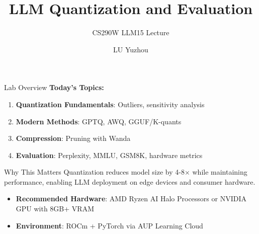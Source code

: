 \documentclass[aspectratio=169,10pt]{beamer}
\title{LLM Quantization and Evaluation}
\subtitle{CS290W LLM15 Lecture}
\author{LU Yuzhou}
\date{}
\begin{document}
\frame{\titlepage}

\begin{frame}{Lab Overview}
    \textbf{Today's Topics:}
    \begin{enumerate}
        \item \textbf{Quantization Fundamentals}: Outliers, sensitivity analysis
        \item \textbf{Modern Methods}: GPTQ, AWQ, GGUF/K-quants
        \item \textbf{Compression}: Pruning with Wanda
        \item \textbf{Evaluation}: Perplexity, MMLU, GSM8K, hardware metrics
    \end{enumerate}

    \vspace{0.5cm}
    \begin{block}{Why This Matters}
        Quantization reduces model size by 4-8$\times$ while maintaining performance, enabling LLM deployment on edge devices and consumer hardware.
    \end{block}

    \vspace{0.3cm}
    \begin{itemize}
        \item \textbf{Recommended Hardware}: AMD Ryzen AI Halo Processors or NVIDIA GPU with 8GB+ VRAM
        \item \textbf{Environment}: ROCm + PyTorch via AUP Learning Cloud
    \end{itemize}
\end{frame}
\end{document}
